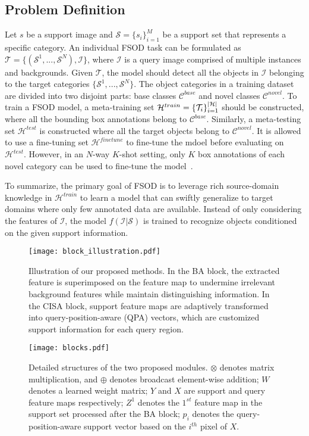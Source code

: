 \documentclass[journal]{IEEEtran}
\DeclarePairedDelimiter\abs{\lvert}{\rvert}
\begin{document}
\subsection{Problem Definition}
Let $s$ be a support image and $\mathcal{S} = \{s_{i}\}^M_{i=1}$ be a support set that represents a specific category.
An individual FSOD task can be formulated as $\mathcal{T}=\{(\mathcal{S}^1, ..., \mathcal{S}^N), \mathcal{I}\}$, where $\mathcal{I}$ is a query image comprised of multiple instances and backgrounds.  
Given $\mathcal{T}$, the model should detect all the objects in $\mathcal{I}$ belonging to the target categories $\{\mathcal{S}^1, ..., \mathcal{S}^N\}$.
The object categories in a training dataset are divided into two disjoint parts: base classes $\mathcal{C}^{base}$ and novel classes $\mathcal{C}^{novel}$. 
To train a FSOD model, a meta-training set $\mathcal{H}^{train}=\{\mathcal{T}_i\}_{i=1}^{\abs{\mathcal{H}}}$ should be constructed, where all the bounding box annotations belong to $\mathcal{C}^{base}$.
Similarly, a meta-testing set $\mathcal{H}^{test}$ is constructed where all the target objects belong to $\mathcal{C}^{novel}$. 
It is allowed to use a fine-tuning set $\mathcal{H}^{finetune}$ to fine-tune the mdoel before evaluating on $\mathcal{H}^{test}$.
However, in an $N$-way $K$-shot setting, only $K$ box annotations of each novel category can be used to fine-tune the model~\cite{karlinsky2019repmet, kang2019few}.


To summarize, the primary goal of FSOD is to leverage rich source-domain knowledge in $\mathcal{H}^{train}$ to learn a model that can swiftly generalize to target domains where only few annotated data are available.
Instead of only considering the features of $\mathcal{I}$, the model $f(\mathcal{I}|\mathcal{S})$ is trained to recognize objects conditioned on the given support information.



\begin{figure}[t]
    \centering
    \texttt{[image: block\_illustration.pdf]}
    \caption{Illustration of our proposed methods. 
    In the BA block, the extracted feature is superimposed on the feature map to undermine irrelevant background features while maintain distinguishing information. 
    In the CISA block, support feature maps are adaptively transformed into query-position-aware (QPA) vectors, which are customized support information for each query region.
}
    \label{fig:block_illustration}
\end{figure}
\begin{figure}[t]
    \centering
    \texttt{[image: blocks.pdf]}
    \caption{Detailed structures of the two proposed modules. $\otimes$ denotes matrix multiplication, and $\oplus$ denotes broadcast element-wise addition; $W$ denotes a learned weight matrix;  $Y$ and $X$ are support and query feature maps respectively; $Z^1$ denotes the $1^{st}$ feature map in the support set processed after the BA block; $p_i$ denotes the query-position-aware support vector based on the $i^{th}$ pixel of $X$.
    }
    \label{fig:blocks}
\end{figure}
\end{document}
